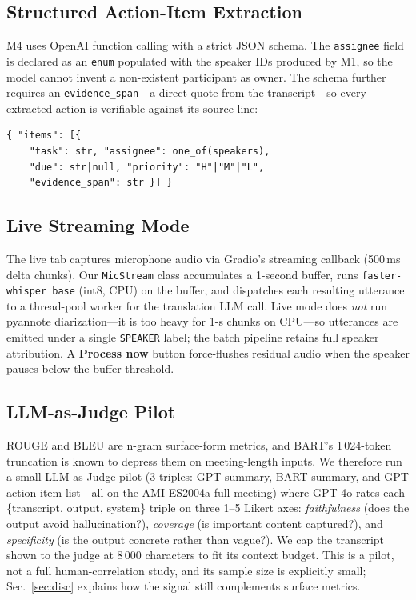 \documentclass[11pt,a4paper]{article}
\begin{document}
\subsection{Structured Action-Item Extraction}

M4 uses OpenAI function calling with a strict JSON schema. The
\texttt{assignee} field is declared as an \texttt{enum} populated with
the speaker IDs produced by M1, so the model cannot invent a
non-existent participant as owner. The schema further requires an
\texttt{evidence\_span}---a direct quote from the transcript---so every
extracted action is verifiable against its source line:
{\small
\begin{verbatim}
{ "items": [{
    "task": str, "assignee": one_of(speakers),
    "due": str|null, "priority": "H"|"M"|"L",
    "evidence_span": str }] }
\end{verbatim}}

\subsection{Live Streaming Mode}

The live tab captures microphone audio via Gradio's streaming
callback (500\,ms delta chunks). Our \texttt{MicStream} class
accumulates a 1-second buffer, runs \texttt{faster-whisper base}
(int8, CPU) on the buffer, and dispatches each resulting utterance to
a thread-pool worker for the translation LLM call. Live mode does
\emph{not} run pyannote diarization---it is too heavy for 1-s chunks
on CPU---so utterances are emitted under a single \texttt{SPEAKER}
label; the batch pipeline retains full speaker attribution.
A \textbf{Process now} button force-flushes residual audio when the
speaker pauses below the buffer threshold.

\subsection{LLM-as-Judge Pilot}
\label{sec:judge}

ROUGE and BLEU are n-gram surface-form metrics, and BART's
1\,024-token truncation is known to depress them on meeting-length
inputs. We therefore run a small LLM-as-Judge pilot (3 triples:
GPT summary, BART summary, and GPT action-item list---all on the AMI
ES2004a full meeting) where GPT-4o rates each \{transcript, output,
system\} triple on three 1--5 Likert axes: \emph{faithfulness}
(does the output avoid hallucination?), \emph{coverage}
(is important content captured?), and \emph{specificity}
(is the output concrete rather than vague?). We cap the transcript
shown to the judge at 8\,000 characters to fit its context budget.
This is a pilot, not a full human-correlation study, and its sample
size is explicitly small; Sec.~\ref{sec:disc} explains how the signal
still complements surface metrics.
\end{document}
